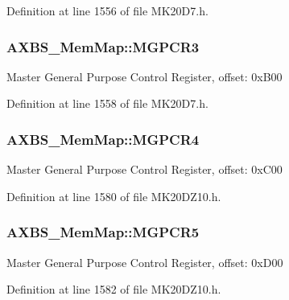 Definition at line 1556 of file M\+K20\+D7.\+h.

\subsubsection[{\texorpdfstring{M\+G\+P\+C\+R3}{MGPCR3}}]{ A\+X\+B\+S\+\_\+\+Mem\+Map\+::\+M\+G\+P\+C\+R3}\hypertarget{struct_a_x_b_s___mem_map_addcba8af91a2a00707fec89422083060}{}\label{struct_a_x_b_s___mem_map_addcba8af91a2a00707fec89422083060}
Master General Purpose Control Register, offset\+: 0x\+B00 

Definition at line 1558 of file M\+K20\+D7.\+h.

\subsubsection[{\texorpdfstring{M\+G\+P\+C\+R4}{MGPCR4}}]{ A\+X\+B\+S\+\_\+\+Mem\+Map\+::\+M\+G\+P\+C\+R4}\hypertarget{struct_a_x_b_s___mem_map_aa612f4c47ff1bbd854bacda326b25aea}{}\label{struct_a_x_b_s___mem_map_aa612f4c47ff1bbd854bacda326b25aea}
Master General Purpose Control Register, offset\+: 0x\+C00 

Definition at line 1580 of file M\+K20\+D\+Z10.\+h.

\subsubsection[{\texorpdfstring{M\+G\+P\+C\+R5}{MGPCR5}}]{ A\+X\+B\+S\+\_\+\+Mem\+Map\+::\+M\+G\+P\+C\+R5}\hypertarget{struct_a_x_b_s___mem_map_acb7e6f493df6513d2eca0df6a7f8f3ed}{}\label{struct_a_x_b_s___mem_map_acb7e6f493df6513d2eca0df6a7f8f3ed}
Master General Purpose Control Register, offset\+: 0x\+D00 

Definition at line 1582 of file M\+K20\+D\+Z10.\+h.

